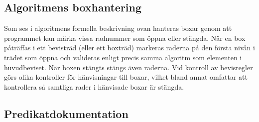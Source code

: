 \documentclass[a4paper,10.5pt]{article}
\begin{document}
\subsection{Algoritmens boxhantering}
\noindent
Som ses i algoritmens formella beskrivning ovan hanteras boxar genom att programmet
kan märka vissa radnummer som öppna eller stängda. När en box
påträffas i ett bevisträd (eller ett boxträd) markeras raderna
på den första nivån i trädet som öppna och valideras enligt
precis samma algoritm som elementen i huvudbeviset. När boxen
stängts stängs även raderna. Vid kontroll av bevisregler
görs olika kontroller för hänvisningar till boxar, vilket
bland annat omfattar att kontrollera så samtliga rader i
hänvisade boxar är stängda.
\vfill

\subsection{Predikatdokumentation}
\end{document}
